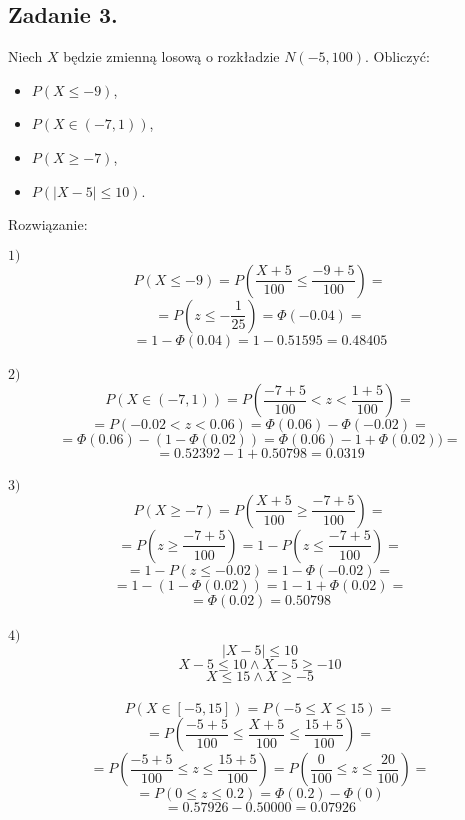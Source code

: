 \subsection{Zadanie 3.}
Niech $X$ będzie zmienną losową o rozkładzie $N ( - 5, 100)$. Obliczyć:
\begin{itemize}
\item $P (X \leq - 9)$, 
\item $P (X \in ( - 7, 1))$, 
\item $P (X \geq - 7)$, 
\item $P ( | X - 5 | \leq 10)$.
\end{itemize}


Rozwiązanie:

$1)$ 
$$ P( X \le -9 ) = P( \frac{X + 5}{100} \le \frac{-9 + 5}{100} ) = $$
$$ = P(z \le - \frac{1}{25}) = \Phi(-0.04) = $$
$$ = 1 -  \Phi(0.04) = 1 - 0.51595 = 0.48405$$ \\

$2)$
$$ P( X \in (-7, 1) ) = P( \frac{-7 + 5}{100} < z < \frac{1 + 5}{100} ) = $$
$$ = P( -0.02 < z <  0.06 ) = \Phi(0.06) - \Phi(-0.02) = $$
$$ = \Phi(0.06) - ( 1 -  \Phi(0.02) ) = \Phi(0.06) - 1 + \Phi(0.02)) = $$
$$ = 0.52392 - 1 + 0.50798 = 0.0319$$ \\

$3)$
$$ P( X \ge -7 ) = P( \frac{X+5}{100} \ge \frac{-7 + 5}{100} ) = $$
$$ = P( z \ge \frac{-7 + 5}{100} ) = 1 - P( z \le \frac{-7 + 5}{100} ) = $$
$$ = 1 - P( z \le -0.02 ) = 1 - \Phi(-0.02) = $$
$$ = 1 - ( 1 - \Phi(0.02) ) = 1 - 1 + \Phi(0.02) = $$
$$ = \Phi(0.02) = 0.50798$$ \\

$4)$
$$ | X - 5 | \le 10 $$
$$ X - 5 \le 10 \wedge X - 5 \ge -10 $$
$$ X \le 15 \wedge X \ge -5 $$ \\
$$ P( X \in [-5, 15] ) =  P( -5 \le X \le 15 ) = $$
$$ = P( \frac{-5 + 5}{100} \le \frac{X + 5}{100} \le \frac{15 + 5}{100} ) = $$
$$ = P( \frac{-5 + 5}{100} \le z \le \frac{15 + 5}{100} ) = P( \frac{0}{100} \le z \le \frac{20}{100} ) = $$
$$ = P( 0 \le z \le 0.2 ) = \Phi(0.2) - \Phi(0) $$
$$ = 0.57926 -0.50000 = 0.07926 $$
